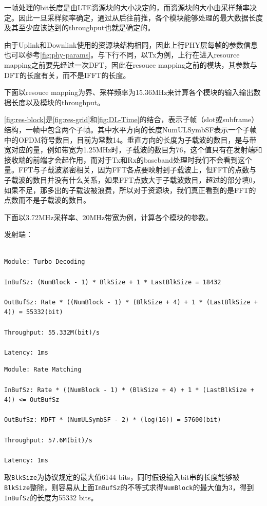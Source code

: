 \documentclass[titlepage]{article}
\numberwithin{figure}{section}
\numberwithin{equation}{section}
\begin{document}
一帧处理的bit长度是由LTE资源块的大小决定的，而资源块的大小由采样频率决定。因此一旦采样频率确定，通过从后往前推，各个模块能够处理的最大数据长度及其至少应该达到的throughput也就是确定的。

由于Uplink和Downlink使用的资源块结构相同，因此上行PHY层每帧的参数信息也可以参考\ref{fig:phy-params}。与下行不同，以Tx为例，上行在进入resource mapping之前要先经过一次DFT，因此在resouce mapping之前的模块，其参数与DFT的长度有关，而不是IFFT的长度。

下面以resouce mapping为界、采样频率为15.36MHz来计算各个模块的输入输出数据长度以及模块的throughput。

\ref{fig:res-block}是\ref{fig:res-grid}和\ref{fig:DL-Time}的结合，表示子帧（slot或subframe）结构，一帧中包含两个子帧。其中水平方向的长度NumULSymbSF表示一个子帧中的OFDM符号数目，目前为常数14。垂直方向的长度为子载波的数目，是与带宽对应的量，例如带宽为1.25MHz时，子载波的数目为76，这个值只有在发射端和接收端的前端才会起作用，而对于Tx和Rx的baseband处理时我们不会看到这个量。FFT与子载波紧密相关，因为FFT各点要映射到子载波上，但FFT的点数与子载波的数目并没有什么关系，如果FFT点数大于子载波数目，超过的部分填0，如果不足，那多出的子载波被浪费，所以对于资源块，我们真正看到的是FFT的点数而不是子载波的数目。

下面以3.72MHz采样率、20MHz带宽为例，计算各个模块的参数。

发射端：

\begin{verbatim}

Module: Turbo Decoding

InBufSz: (NumBlock - 1) * BlkSize + 1 * LastBlkSize = 18432

OutBufSz: Rate * ((NumBlock - 1) * (BlkSize + 4) + 1 * (LastBlkSize + 4)) = 55332(bit)

Throughput: 55.332M(bit)/s

Latency: 1ms
\end{verbatim}

\begin{verbatim}
Module: Rate Matching

InBufSz: Rate * ((NumBlock - 1) * (BlkSize + 4) + 1 * (LastBlkSize + 4)) <= OutBufSz

OutBufSz: MDFT * (NumULSymbSF - 2) * (log(16)) = 57600(bit)

Throughput: 57.6M(bit)/s

Latency: 1ms
\end{verbatim}

取\verb|BlkSize|为协议规定的最大值6144 bits，同时假设输入bit串的长度能够被\verb|BlkSize|整除，则容易从上面\verb|InBufSz|的不等式求得\verb|NumBlock|的最大值为3，得到\verb|InBufSz|的长度为55332 bits。
\end{document}
